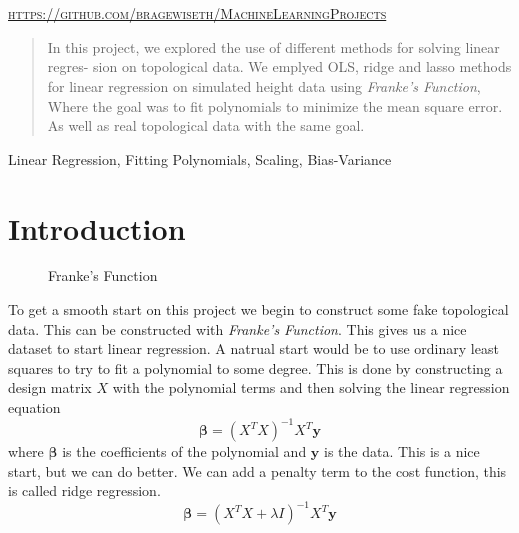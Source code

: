 \documentclass[twoside,11pt]{report}
\begin{document}
\begin{titlepage}
\begin{minipage}{0.4\textwidth}
	\end{minipage}\\[2 cm]
	\@date\\
    \vspace*{25mm}
    \textsc{\url{https://github.com/bragewiseth/MachineLearningProjects}}
	
	
    
    
    
    
	
\end{titlepage}
\nocite{*}
\newpage
\tableofcontents
\newpage

\begin{abstract}%
\lettrine{I}{}n this project, we explored the use of different methods for solving linear regres-
sion on topological data. We emplyed OLS, ridge and lasso methods for linear regression on
simulated height data using \emph{Franke's Function}, Where the goal was to fit polynomials to minimize the mean square error. As well as real topological data with the same goal.
\end{abstract}
\begin{keywords}
    Linear Regression, Fitting Polynomials, Scaling, Bias-Variance 
\end{keywords}

\section{Introduction}

\begin{figure}
    \caption{\small Franke's Function}
    \label{frankfunc}
    \begin{center}
    \begin{adjustbox}{clip,trim=4cm 3.4cm 3cm 4.8cm, max width=0.3\textwidth}
    
    \end{adjustbox}
    \end{center}
\end{figure}
To get a smooth start on this project we begin to construct some fake topological data. This can be constructed with
\emph{Franke's Function}. This gives us a nice dataset to start linear regression. 
A natrual start would be to use ordinary least squares to try to fit a polynomial to some degree. This is done by
constructing a design matrix $X$ with the polynomial terms and then solving the linear regression equation
\begin{equation}
    \boldsymbol{\beta} = (X^T X)^{-1} X^T \boldsymbol{y}
\end{equation}
where $\boldsymbol{\beta}$ is the coefficients of the polynomial and $\boldsymbol{y}$ is the data.
This is a nice start, but we can do better. We can add a penalty term to the cost function, this is called ridge regression.
\begin{equation}
    \boldsymbol{\beta} = (X^T X + \lambda I)^{-1} X^T \boldsymbol{y}
\end{equation}
\end{document}
